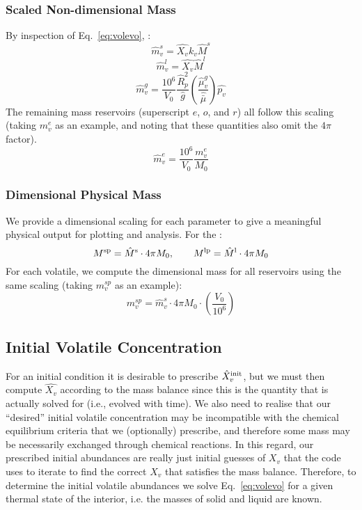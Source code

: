 \subsubsection{Scaled Non-dimensional Mass}
By inspection of Eq.~\ref{eq:volevo}, :
\begin{equation}
\hat{m}_v^s = \hat{X_v} k_v \hat{M}^s
\end{equation}
\begin{equation}
\hat{m}_v^l = \hat{X_v} \hat{M}^l
\end{equation}
\begin{equation}
\hat{m}_v^g = \frac{10^6}{V_0} \frac{\hat{R}_p^2}{\hat{g}} \left( \frac{\hat{\mu}_v^g}{\hat{\bar{\mu}}} \right) \hat{p_v}
\end{equation}
The remaining mass reservoirs (superscript $e$, $o$, and $r$) all follow this scaling (taking $m_v^e$ as an example, and noting that these quantities also omit the $4 \pi$ factor).
\begin{equation}
\hat{m}_v^e = \frac{10^6}{V_0} \frac{m_v^e}{M_0}
\end{equation}
\subsubsection{Dimensional Physical Mass}
We provide a dimensional scaling for each parameter to give a meaningful physical output for plotting and analysis.  For the :
\begin{equation}
M^{\rm sp} = \hat{M}^{\rm s} \cdot 4 \pi M_0, \qquad M^{\rm lp} = \hat{M}^{\rm l} \cdot 4 \pi M_0
\end{equation}
For each volatile, we compute the dimensional mass for all reservoirs using the same scaling (taking $m_v^{sp}$ as an example):
\begin{equation}
m_v^{sp} = \hat{m}_v^s \cdot 4 \pi M_0 \cdot \left( \frac{V_0}{10^6} \right)
\end{equation}
\subsection{Initial Volatile Concentration}
For an initial condition it is desirable to prescribe $\hat{X}_v^{\rm init}$, but we must then compute $\hat{X_v}$ according to the mass balance since this is the quantity that is actually solved for (i.e., evolved with time).  We also need to realise that our ``desired'' initial volatile concentration may be incompatible with the chemical equilibrium criteria that we (optionally) prescribe, and therefore some mass may be necessarily exchanged through chemical reactions.  In this regard, our prescribed initial abundances are really just initial guesses of $X_v$ that the code uses to iterate to find the correct $X_v$ that satisfies the mass balance.  Therefore, to determine the initial volatile abundances we solve Eq.~\ref{eq:volevo} for a given thermal state of the interior, i.e. the masses of solid and liquid are known.

